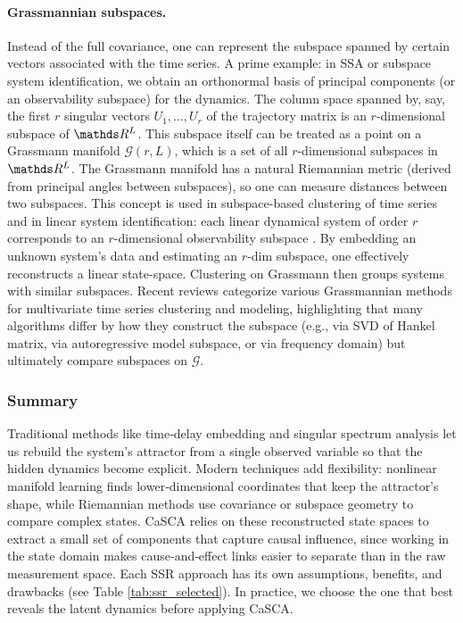 \documentclass[14pt]{extarticle}
\begin{document}
	\paragraph{Grassmannian subspaces.}  
	Instead of the full covariance, one can represent the subspace spanned by certain vectors associated with the time series.
	A prime example: in SSA or subspace system identification, we obtain an orthonormal basis of principal components (or an observability subspace) for the dynamics.
	The column space spanned by, say, the first $r$ singular vectors $U_1,\dots,U_r$ of the trajectory matrix is an $r$-dimensional subspace of $\dR^L$.
	This subspace itself can be treated as a point on a Grassmann manifold $\mathcal{G}(r, L)$, which is a set of all $r$-dimensional subspaces in $\dR^L$.
	The Grassmann manifold has a natural Riemannian metric (derived from principal angles between subspaces), so one can measure distances between two subspaces.
	This concept is used in subspace-based clustering of time series and in linear system identification: each linear dynamical system of order $r$ corresponds to an $r$-dimensional observability subspace \citep{hamm2008grassmann,turaga2011statistical}.
	By embedding an unknown system’s data and estimating an $r$-dim subspace, one effectively reconstructs a linear state-space.
	Clustering on Grassmann then groups systems with similar subspaces.
	Recent reviews categorize various Grassmannian methods for multivariate time series clustering and modeling, highlighting that many algorithms differ by how they construct the subspace (e.g., via SVD of Hankel matrix, via autoregressive model subspace, or via frequency domain) but ultimately compare subspaces on $\mathcal{G}$.
	
	\subsubsection*{Summary}
	
	Traditional methods like time‐delay embedding and singular spectrum analysis let us rebuild the system’s attractor from a single observed variable so that the hidden dynamics become explicit.  
	Modern techniques add flexibility: nonlinear manifold learning finds lower‐dimensional coordinates that keep the attractor’s shape, while Riemannian methods use covariance or subspace geometry to compare complex states.  
	CaSCA relies on these reconstructed state spaces to extract a small set of components that capture causal influence, since working in the state domain makes cause‐and‐effect links easier to separate than in the raw measurement space.  
	Each SSR approach has its own assumptions, benefits, and drawbacks (see Table \ref{tab:ssr_selected}). In practice, we choose the one that best reveals the latent dynamics before applying CaSCA.
	
\end{document}

